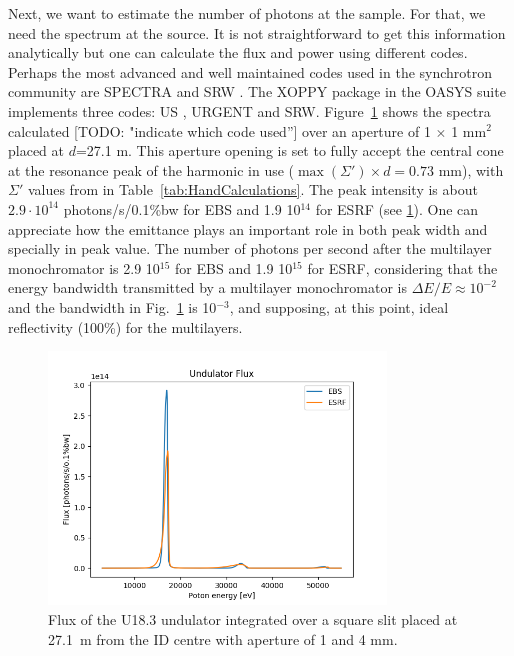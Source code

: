 \documentclass{iucr}              %
\newcommand{\todo}[1]{{\color{red}[TODO: "#1'']}}
\begin{document}
Next, we want to estimate the number of photons at the sample. For that, we need the spectrum at the source. It is not straightforward to get this information analytically but one can calculate the flux and power using different codes. Perhaps the most advanced and well maintained codes used in the synchrotron community are SPECTRA \cite{codeSPECTRA} and SRW \cite{codeSRW}. The XOPPY package in the OASYS suite implements three codes: US \cite{codeUS}, URGENT \cite{codeURGENT} and SRW. Figure~\ref{fig:FluxU18} shows the spectra calculated \todo{indicate which code used} over an aperture of 1 $\times$ 1 mm$^2$ placed at $d$=27.1 m. This aperture opening is set to fully accept the central cone at the resonance peak of the harmonic in use ($\max(\Sigma') \times d = 0.73$ mm), with $\Sigma'$ values from in Table~\ref{tab:HandCalculations}. The peak intensity is about  $2.9\cdot10^{14}$ photons/s/0.1{\%}bw for EBS and 1.9 10$^{14}$ for ESRF (see \ref{fig:FluxU18}). One can appreciate how the emittance plays an important role in both peak width and specially in peak value. The number of photons per second after the multilayer monochromator is 2.9 10$^{15}$ for EBS and 1.9 10$^{15}$ for ESRF, considering that the energy bandwidth transmitted by a multilayer monochromator is $\Delta E/E \approx 10^{-2}$ and the bandwidth in Fig.~\ref{fig:FluxU18} is 10$^{-3}$, and supposing, at this point, ideal reflectivity (100\%) for the multilayers. 

\begin{figure}\label{fig:FluxU18}
    \centering
    \includegraphics[width=0.8\textwidth]{GRAPHICS/fluxU18.png}
    \caption{Flux of the U18.3 undulator integrated over a square slit placed at 27.1~m from the ID centre with aperture of 1 and 4 mm.}
\end{figure}
\end{document}

